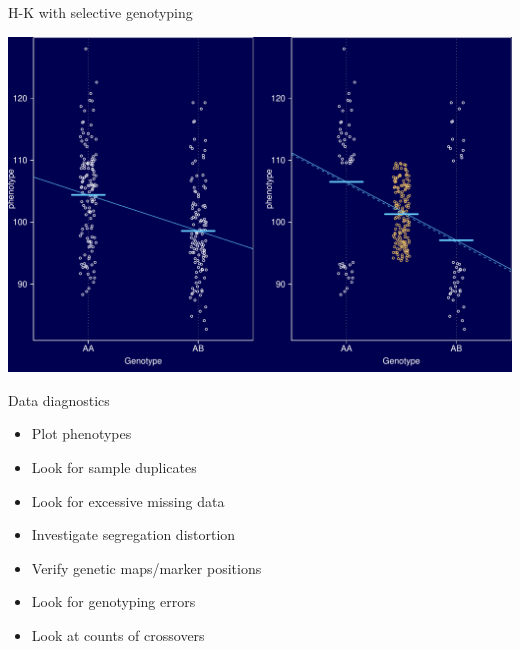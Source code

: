 \documentclass[12pt]{article}
\newcommand{\headsize}{\fontsize{35}{35} \selectfont}
\newcommand{\smallsize}{\fontsize{25}{30} \selectfont}
\begin{document}
\newpage

\headsize \color{myyellow}
\hfill \begin{minipage}{5.75in}
\centering
H-K with selective genotyping
\end{minipage}

\vfill

\centerline{\includegraphics{Figs/hk_selgeno.pdf}}







\newpage

\headsize \color{myyellow}
\hfill \begin{minipage}{5.75in}
\centering
Data diagnostics
\end{minipage}

\vspace{3cm}

\color{mywhite} \smallsize

\hfill \begin{minipage}[t]{9.5in}
\begin{itemize}
\itemsep18pt
\item Plot phenotypes
\item Look for sample duplicates
\item Look for excessive missing data
\item Investigate segregation distortion
\item Verify genetic maps/marker positions
\item Look for genotyping errors
\item Look at counts of crossovers
\end{itemize} \end{minipage}
\end{document}
